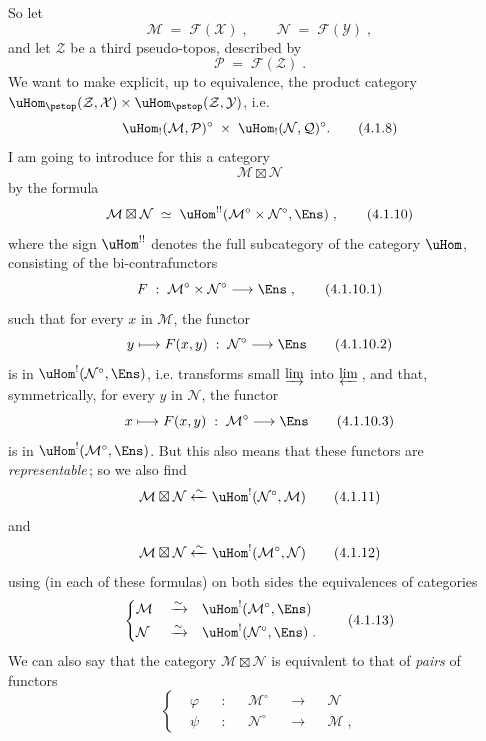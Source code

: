 So let
\[
\mathcal{M} \;=\; \mathcal{F}(\mathcal{X})\;, \qquad \mathcal{N} \;=\; \mathcal{F}(\mathcal{Y})\;,
\tag*{(4.1.6)}
\]
and let $\mathcal{Z}$ be a third pseudo-topos, described by
\[
\mathcal{P} \;=\; \mathcal{F}(\mathcal{Z})\;.
\tag*{(4.1.7)}
\]
We want to make explicit, up to equivalence, the product category $\uHom_{\pstop}(\mathcal{Z},\mathcal{X})\times\uHom_{\pstop}(\mathcal{Z},\mathcal{Y})$, i.e.
\[
\uHom_!(\mathcal{M},\mathcal{P})^\circ \;\times\; \uHom_!(\mathcal{N},\mathcal{Q})^\circ.
\tag*{(4.1.8)}
\] %
I am going to introduce for this a category
\[
\mathcal{M}\boxtimes\mathcal{N}
\tag*{(4.1.9)}
\]
by the formula
\[
\mathcal{M}\boxtimes\mathcal{N} \;\simeq\; \uHom^{!!}(\mathcal{M}^\circ\times\mathcal{N}^\circ,\Ens)\;,
\tag*{(4.1.10)}
\]
where the sign $\uHom^{!!}$ denotes the full subcategory of the category $\uHom$, consisting of the bi-contrafunctors %
\[
F \;:\; \mathcal{M}^\circ\times\mathcal{N}^\circ \longrightarrow \Ens\;,
\tag*{(4.1.10.1)}
\]
such that for every $x$ in $\mathcal{M}$, the functor
\[
y \longmapsto F(x,y) \;:\; \mathcal{N}^\circ \longrightarrow \Ens
\tag*{(4.1.10.2)}
\]
is in $\uHom^!(\mathcal{N}^\circ,\Ens)$, i.e. transforms small $\varinjlim$ into $\varprojlim$\,, and that, symmetrically, for every $y$ in $\mathcal{N}$, the functor
\[
x \longmapsto F(x,y) \;:\; \mathcal{M}^\circ \longrightarrow \Ens
\tag*{(4.1.10.3)}
\]
is in $\uHom^!(\mathcal{M}^\circ,\Ens)$. But this also means that these functors are \textit{representable}\,; so we also find
\[
\mathcal{M}\boxtimes\mathcal{N} \xleftarrow{\sim} \uHom^!(\mathcal{N}^\circ,\mathcal{M})
\tag*{(4.1.11)}
\]
and
\[
\mathcal{M}\boxtimes\mathcal{N} \xleftarrow{\sim} \uHom^!(\mathcal{M}^\circ,\mathcal{N})
\tag*{(4.1.12)}
\]
using (in each of these formulas) on both sides the equivalences of categories
\[
\left\{
\begin{aligned}
&\mathcal{M} &&\xrightarrow{\sim} &&\uHom^!(\mathcal{M}^\circ,\Ens)\\
&\mathcal{N} &&\xrightarrow{\sim} &&\uHom^!(\mathcal{N}^\circ,\Ens)\;.
\end{aligned}
\right.
\tag*{(4.1.13)}
\]
We can also say that the category $\mathcal{M}\boxtimes\mathcal{N}$ is equivalent to that of \textit{pairs} of functors
\[
\left\{
\begin{aligned}
&\varphi &&: &&\mathcal{M}^\circ &&\longrightarrow &&\mathcal{N}\\
&\psi &&: &&\mathcal{N}^\circ &&\longrightarrow &&\mathcal{M}\;,
\end{aligned}
\right.
\tag*{(4.1.14)}
\]
